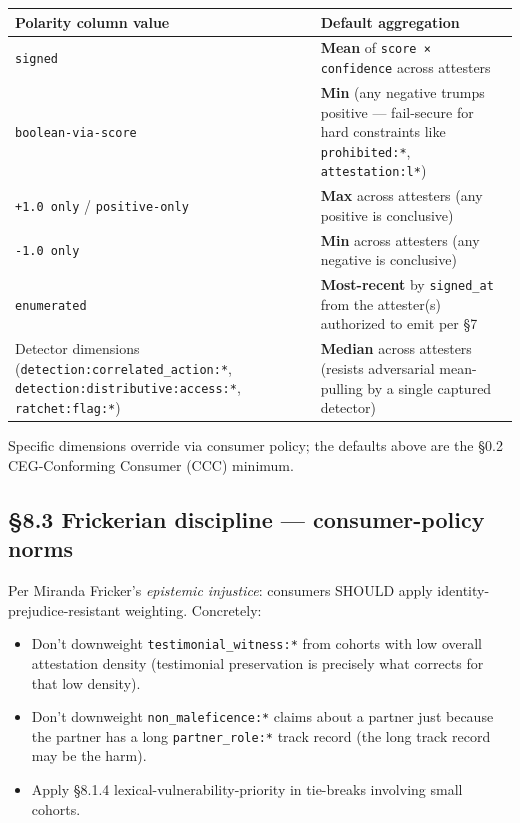 \documentclass[11pt]{article}
\begin{document}
{\footnotesize
\begin{longtable}{|p{8.0cm}|p{8.0cm}|}\hline
\textbf{Polarity column value} & \textbf{Default aggregation} \\ \hline\endhead
\texttt{signed} & \textbf{Mean} of \texttt{score × confidence} across attesters \\ \hline
\texttt{boolean-via-score} & \textbf{Min} (any negative trumps positive — fail-secure for hard constraints like \texttt{prohibited:*}, \texttt{attestation:l*}) \\ \hline
\texttt{+1.0 only} / \texttt{positive-only} & \textbf{Max} across attesters (any positive is conclusive) \\ \hline
\texttt{-1.0 only} & \textbf{Min} across attesters (any negative is conclusive) \\ \hline
\texttt{enumerated} & \textbf{Most-recent} by \texttt{signed\_at} from the attester(s) authorized to emit per §7 \\ \hline
Detector dimensions (\texttt{detection:correlated\_action:*}, \texttt{detection:distributive:access:*}, \texttt{ratchet:flag:*}) & \textbf{Median} across attesters (resists adversarial mean-pulling by a single captured detector) \\ \hline
\end{longtable}}


Specific dimensions override via consumer policy; the defaults above are the §0.2 CEG-Conforming Consumer (CCC) minimum.


\subsection*{§8.3 Frickerian discipline — consumer-policy norms}


Per Miranda Fricker's \textit{epistemic injustice}: consumers SHOULD apply identity-prejudice-resistant weighting. Concretely:


\begin{itemize}\setlength\itemsep{0pt}
\item Don't downweight \texttt{testimonial\_witness:*} from cohorts with low overall attestation density (testimonial preservation is precisely what corrects for that low density).
\item Don't downweight \texttt{non\_maleficence:*} claims about a partner just because the partner has a long \texttt{partner\_role:*} track record (the long track record may be the harm).
\item Apply §8.1.4 lexical-vulnerability-priority in tie-breaks involving small cohorts.
\end{itemize}
\end{document}
